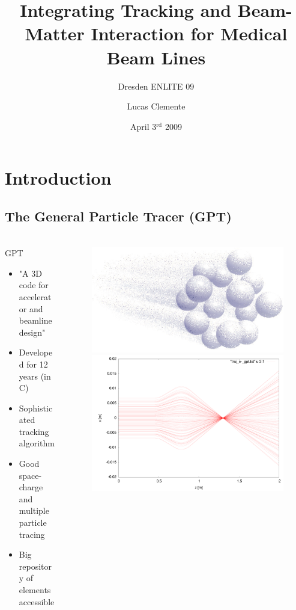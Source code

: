 \documentclass{beamer}
\title[Flint - A tool for beamline design]{Integrating Tracking and Beam-Matter Interaction for Medical Beam Lines}
\subtitle{Dresden E{\smaller NLITE} 09}
\author{Lucas Clemente}
\institute{FZD, Dresden}
\date{April 3$^{\text{rd}}$ 2009}
\newcommand{\ident}{\thesection.\thesubsection}
\newcommand{\mysubsection}[1]{\subsection{#1}\label{\ident}}
\newcommand{\ftitle}{\frametitle{\nameref{\ident}}}
\begin{document}
\begin{frame}
	\titlepage
\end{frame} 

\section{Introduction}

\mysubsection{The General Particle Tracer (GPT)}

\begin{frame}
	\ftitle
	\begin{columns}
		\begin{column}{6cm}
			\begin{block}{GPT}
				\begin{itemize}
					\item "A 3D code for accelerator and beamline design"
					\item Developed for 12 years (in C)
					\item Sophisticated tracking algorithm
					\item Good space-charge and multiple particle tracing
					\item Big repository of elements accessible
				\end{itemize}
			\end{block}
		\end{column}
		\begin{column}{5cm}
			\begin{figure}
				\includegraphics[width=0.7\columnwidth]{img/gpt}\vskip 0.5cm
				\includegraphics[width=\columnwidth]{img/quadrupole_gpt}
			\end{figure}
		\end{column}
	\end{columns}
\end{frame}
\end{document}
